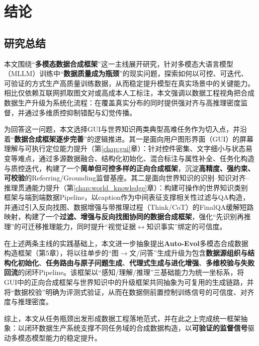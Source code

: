 \chapter{结论}

\section{研究总结}
本文围绕“\textbf{多模态数据合成框架}”这一主线展开研究，针对多模态大语言模型（MLLM）训练中“\textbf{数据质量成为瓶颈}”的现实问题，探索如何以可控、可迭代、可验证的方式生产高质量训练数据，从而稳定提升模型在真实场景中的关键能力。相比仅依赖互联网抓取图文对或高成本人工标注，本文强调以数据工程视角把合成数据生产升级为系统化流程：在覆盖真实分布的同时提供强对齐与高推理密度监督，并通过多维质控抑制错配与幻觉传播。

为回答这一问题，本文选择GUI与世界知识两类典型高难任务作为切入点，并沿着“\textbf{数据合成框架逐步完善}”的逻辑推进。其一是面向用户图形界面（GUI）的屏幕理解与可执行定位能力提升（第\ref{chap:gui}章）：针对控件密集、文字细小与状态易变等难点，通过多源数据融合、结构化初始化、混合标注与属性补全、任务化构造与质控迭代，构建了一个\textbf{简单但可控多样的正向合成框架}，沉淀\textbf{高精度、强约束、可校验}的Referring/Grounding监督基座。其二是面向世界知识的识别--知识对齐--推理贯通能力提升（第\ref{chap:world_knowledge}章）：构建可操作的世界知识类别框架与端到端数据Pipeline，以caption作为中间表征支撑相关性过滤与QA构造，并通过引入反向找图、数据增强与带推理过程（Think/CoT）的FinalQA缓解短路映射，构建了一个\textbf{过滤、增强与反向找图协同的数据合成框架}，强化“先识别再推理”的可迁移推理能力，同时提升“视觉证据$\leftrightarrow$知识事实”绑定的可信度。

在上述两条主线的实践基础上，本文进一步抽象提出\textbf{Auto-Evol}多模态合成数据构造框架（第5章），将以往单步的“图$\rightarrow$文/问答”生成升级为包含\textbf{数据源组织与结构化初始化}、\textbf{任务路由与原子问题生成}、\textbf{代理式生成与进化增强}、\textbf{多维校验与失败回流}的闭环Pipeline。该框架以“感知/理解/推理”三基础能力为统一坐标系，将GUI中的正向合成框架与世界知识中的升级框架共同抽象为可复用的生成链路，并将“数据校验”明确为评测式验证，从而在数据侧前置控制训练信号的可信度、对齐度与推理密度。

综上，本文从任务瓶颈出发形成数据工程落地范式，并在此之上完成统一框架抽象：以闭环数据生产系统支撑不同任务域的合成数据构造，以\textbf{可验证的监督信号}驱动多模态模型能力的稳定提升。

